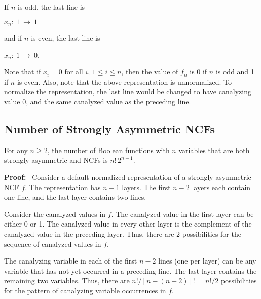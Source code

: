 \smallskip

\noindent
If $n$ is odd, the last line is 

\smallskip

\noindent
\hspace*{0.25in}
$x_n:~ 1 ~\longrightarrow~ 1$ 

\smallskip

\noindent
and if $n$ is even, the last line is 

\smallskip

\noindent
\hspace*{0.25in}
$x_n:~ 1 ~\longrightarrow~ 0$. 

\smallskip

\noindent
Note that if $x_i = 0$ for all $i$, $1 \leq i \leq n$, then the
value of $f_n$ is 0 if $n$ is odd and 1 if $n$ is even.  Also, note
that the above representation is unnormalized. To normalize the
representation, the last line would be changed to have canalyzing
value 0, and the same canalyzed value as the preceding line.

\subsection{Number of Strongly Asymmetric NCFs}
\label{sse:number_strongly_asymmetric}

\begin{theorem}\label{thm:count_strongly_asymmetric}
For any $n \geq 2$, the number of Boolean functions with $n$ variables 
that are both strongly asymmetric and NCFs is $n! \, 2^{n-1}$.
\end{theorem}

\noindent
\textbf{Proof:}~
Consider a default-normalized representation of a strongly asymmetric NCF $f$.
The representation has $n-1$ layers.
The first $n-2$ layers each contain one line, and the last layer contains two lines.

Consider the canalyzed values in $f$. The canalyzed value in the
first layer can be either 0 or 1.  The canalyzed value in every
other layer is the complement of the canalyzed value in the preceding
layer.  Thus, there are 2 possibilities for the sequence of canalyzed
values in $f$.

The canalyzing variable in each of the first $n-2$ lines (one per
layer) can be any variable that has not yet occurred in a preceding
line.  The last layer contains the remaining two variables.  Thus,
there are $n! /[n-(n-2)]!$ = $n!/2$ possibilities for the pattern of 
canalyzing variable occurrences in $f$.

